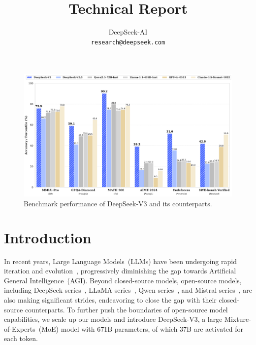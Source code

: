 \documentclass[11pt, a4paper, logo, copyright, nonumbering]{deepseek}
\title{\centering \dsviii{} Technical Report}
\author[*]{
DeepSeek-AI
\\
\small
\texttt{research@deepseek.com}
}
\newcommand{\dsviii}{DeepSeek-V3}
\begin{document}
\begin{CJK*}{UTF8}{gbsn}

\maketitle

\begin{figure}[h]
\centering
\includegraphics[width=\textwidth]{figures/dsv3_performance.pdf}
\caption{
    \centering
    Benchmark performance of \dsviii{} and its counterparts.
}
\label{fig:dsv3_performance}
\end{figure}

\newpage

\begin{spacing}{0.9}
\tableofcontents
\end{spacing}

\newpage

\section{Introduction}

In recent years, Large Language Models~(LLMs) have been undergoing rapid iteration and evolution~\citep{gpt4o,claude35sonnet,gemini1_5}, progressively diminishing the gap towards Artificial General Intelligence~(AGI).
Beyond closed-source models, open-source models, including DeepSeek series~\citep{dsvi,dsvii,dscodervi,dscodervii}, LLaMA series~\citep{llama,llama2,llama3,llama3_1_405b}, Qwen series~\citep{qwen,qwen1_5,qwen2_5}, and Mistral series~\citep{mistral,mixtral8x22b}, are also making significant strides, endeavoring to close the gap with their closed-source counterparts.
To further push the boundaries of open-source model capabilities, we scale up our models and introduce \dsviii{}, a large Mixture-of-Experts~(MoE) model with 671B parameters, of which 37B are activated for each token.


\end{CJK*}
\end{document}

